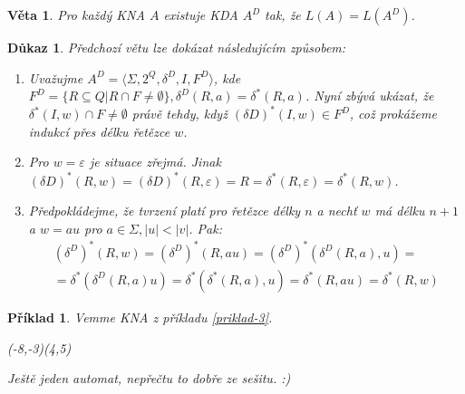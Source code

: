 \documentclass[10pt, a4paper, titlepage]{article}
\theoremstyle{note}
\newtheorem{veta}{Věta}
\newtheorem{dukaz}{Důkaz}
\newtheorem{priklad}{Příklad}
\begin{document}
\begin{veta}
Pro každý KNA $A$ existuje KDA $A^{D}$ tak, že $L(A) = L(A^{D})$.
\end{veta}
\begin{dukaz}
Předchozí větu lze dokázat následujícím způsobem:

\begin{enumerate}
\item
Uvažujme $A^{D} = \langle \Sigma, 2^{Q}, \delta^{D}, I, F^{D} \rangle$, kde $F^{D} = \lbrace R  \subseteq Q | R \cap F \neq \emptyset \rbrace, \delta^{D}(R,a) = \delta^{*}(R,a)$.
Nyní zbývá ukázat, že $\delta^{*}(I,w) \cap F \neq \emptyset$ právě tehdy, když $(\delta{D})^{*}(I,w) \in F^{D}$, což prokážeme indukcí přes délku řetězce $w$.

\item
Pro $w = \varepsilon$ je situace zřejmá. Jinak $(\delta{D})^{*} (R,w) = (\delta{D})^{*} (R, \varepsilon) = R = \delta^{*}(R, \varepsilon) = \delta^{*}(R,w)$.

\item
Předpokládejme, že tvrzení platí pro řetězce délky $n$ a nechť $w$ má délku $n+1$ a $w=au$ pro $a \in \Sigma, |u| < |v|$. Pak:
\begin{gather*}
(\delta^{D})^{*} (R,w) = (\delta^{D})^{*} (R, au) = (\delta^{D})^{*}(\delta^{D}(R,a),u) = \\
= \delta^{*}(\delta^{D}(R,a)u) = \delta^{*}(\delta^{*}(R,a),u) = \delta^{*}(R, au) = \delta^{*}(R,w)
\end{gather*}
\end{enumerate}
\end{dukaz}

\begin{priklad}
Vemme KNA z příkladu \ref{priklad-3}.

\begin{VCPicture}{(-8,-3)(4,5)}


\end{VCPicture}

Ještě jeden automat, nepřečtu to dobře ze sešitu. :)

\end{priklad}
\end{document}

